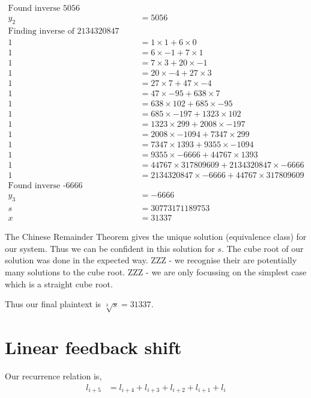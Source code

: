 \documentclass{article}
\begin{document}
\begin{align*}
    \text{Found inverse 5056} \\
    y_2 &= 5056 \\
    \text{Finding inverse of 2134320847 and 44767} \\
    1 &= 1 \times 1 + 6 \times 0 \\
    1 &= 6 \times -1 + 7 \times 1 \\
    1 &= 7 \times 3 + 20 \times -1 \\
    1 &= 20 \times -4 + 27 \times 3 \\
    1 &= 27 \times 7 + 47 \times -4 \\
    1 &= 47 \times -95 + 638 \times 7 \\
    1 &= 638 \times 102 + 685 \times -95 \\
    1 &= 685 \times -197 + 1323 \times 102 \\
    1 &= 1323 \times 299 + 2008 \times -197 \\
    1 &= 2008 \times -1094 + 7347 \times 299 \\
    1 &= 7347 \times 1393 + 9355 \times -1094 \\
    1 &= 9355 \times -6666 + 44767 \times 1393 \\
    1 &= 44767 \times 317809609 + 2134320847 \times -6666 \\
    1 &= 2134320847 \times -6666 + 44767 \times 317809609 \\
    \text{Found inverse -6666} \\
    y_3 &= -6666 \\
    s &= 30773171189753 \\
    x &= 31337
\end{align*}

The Chinese Remainder Theorem gives the unique solution (equivalence class)
for our system. Thus we can be confident in this solution for $s$.
The cube root of our solution was done in the expected way.
ZZZ - we recognise their are potentially many solutions to the cube root.
ZZZ - we are only focussing on the simplest case which is a straight cube root.

Thus our final plaintext is $\sqrt[3]{s} = 31337$.

\section{Linear feedback shift}
Our recurrence relation is,
\begin{align*}
    l_{i+5} &= l_{i+4} + l_{i+3} + l_{i+2} + l_{i+1} + l_{i}
\end{align*}
\end{document}
